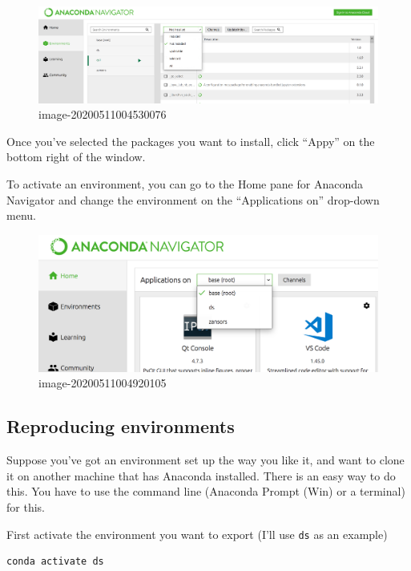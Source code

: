 \documentclass[
  letterpaper,
]{scrbook}
\begin{document}
\begin{figure}
\centering
\includegraphics{graphs/AN_env_3.png}
\caption{image-20200511004530076}
\end{figure}

Once you've selected the packages you want to install, click ``Appy'' on the bottom right of the window.

To activate an environment, you can go to the Home pane for Anaconda Navigator and change the environment on the ``Applications on'' drop-down menu.

\begin{figure}
\centering
\includegraphics{graphs/AN_env_4.png}
\caption{image-20200511004920105}
\end{figure}

\hypertarget{reproducing-environments}{%
\subsection{Reproducing environments}\label{reproducing-environments}}

Suppose you've got an environment set up the way you like it, and want to clone it on another machine that has Anaconda installed. There is an easy way to do this. You have to use the command line (Anaconda Prompt (Win) or a terminal) for this.

First activate the environment you want to export (I'll use \texttt{ds} as an example)

\begin{verbatim}
conda activate ds
\end{verbatim}
\end{document}
